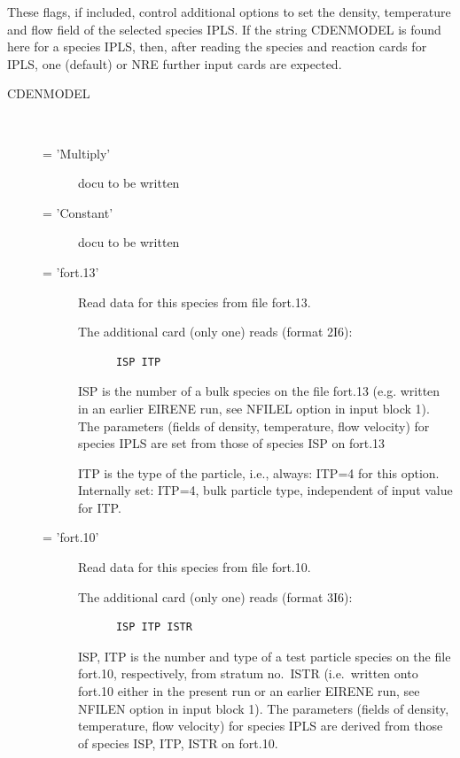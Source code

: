 These flags, if included, control additional options to set the density,
temperature and flow field of the selected species IPLS.
If the string CDENMODEL is found here for a species IPLS, then, after reading
the species and reaction cards for IPLS, one (default) or NRE further input
cards are expected.
\begin{description}
  \item[CDENMODEL] ~ 

        \begin{description}
          \item[= 'Multiply'] docu to be written
          \item[= 'Constant']
                docu to be written
          \item[= 'fort.13'] Read data for this species from file
                fort.13.

                The additional card (only one) reads (format 2I6):

                \begin{lstlisting}
      ISP ITP
\end{lstlisting}

                ISP is the number of a bulk species on the file fort.13 (e.g. written in an
                earlier EIRENE run, see NFILEL option in input block 1).
                The parameters (fields of density, temperature, flow velocity) for species IPLS
                are set from those of species ISP on fort.13 

                ITP is the type of the particle, i.e., always: ITP=4 for this option.
                Internally set: ITP=4, bulk particle type, independent of input value for ITP.

          \item[= 'fort.10'] Read data for this species from file fort.10.

                The additional card (only one) reads (format 3I6):

                \begin{lstlisting}
      ISP ITP ISTR
\end{lstlisting}

                ISP, ITP is the number and type of a test particle species on the file fort.10,
                respectively, from stratum no.\ ISTR (i.e.\ written onto fort.10 either in the
                present run or an earlier EIRENE run, see NFILEN option in input block 1).
                The parameters (fields of density, temperature, flow velocity) for species IPLS
                are derived from those of species ISP, ITP, ISTR on fort.10.


\end{description}
\end{description}

